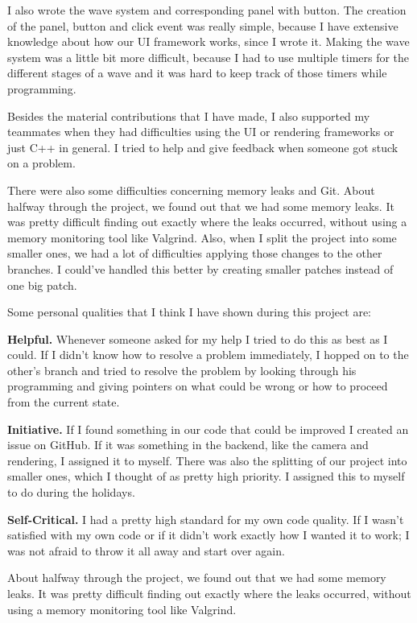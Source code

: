 I also wrote the wave system and corresponding panel with button. 
The creation of the panel, button and click event was really simple, because 
I have extensive knowledge about how our UI framework works, since I wrote it.
Making the wave system was a little bit more difficult, because I had to use 
multiple timers for the different stages of a wave and it was hard to keep 
track of those timers while programming.

Besides the material contributions that I have made, I also supported my 
teammates when they had difficulties using the UI or rendering frameworks or 
just C++ in general. I tried to help and give feedback when someone got 
stuck on a problem.

There were also some difficulties concerning memory leaks and Git.
About halfway through the project, we found out that we had some memory leaks.
It was pretty difficult finding out exactly where the leaks occurred, without 
using a memory monitoring tool like Valgrind.
Also, when I split the project into some smaller ones, we had a lot of 
difficulties applying those changes to the other branches. I could've handled
this better by creating smaller patches instead of one big patch.

Some personal qualities that I think I have shown during this project are:

\textbf{Helpful.} Whenever someone asked for my help I tried to do this as 
best as I could. If I didn't know how to resolve a problem immediately, I 
hopped on to the other's branch and tried to resolve the problem by looking 
through his programming and giving pointers on what could be wrong or how to 
proceed from the current state.

\textbf{Initiative.} If I found something in our code that could be improved 
I created an issue on GitHub. If it was something in the backend, like the 
camera and rendering, I assigned it to myself. There was also the splitting 
of our project into smaller ones, which I thought of as pretty high priority.
I assigned this to myself to do during the holidays.

\textbf{Self-Critical.} I had a pretty high standard for my own code quality.
If I wasn't satisfied with my own code or if it didn't work exactly how I 
wanted it to work; I was not afraid to throw it all away and start over again.

About halfway through the project, we found out that we had some memory leaks.
It was pretty difficult finding out exactly where the leaks occurred, without 
using a memory monitoring tool like Valgrind.

